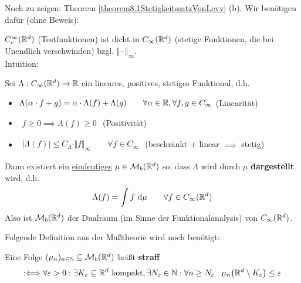 Noch zu zeigen: Theorem \ref{theorem8.1StetigkeitssatzVonLevy} (b). Wir benötigen dafür (ohne Beweis):

\begin{lemma}\label{lemma8.2}
	$C_c^\infty(\mathbb{R}^d)$ (Testfunktionen) ist dicht in $C_\infty(\mathbb{R}^d)$ (stetige Funktionen, die bei Unendlich verschwinden) bzgl. $\Vert\cdot\Vert_\infty$.\\
	Intuition: %
\end{lemma}

\begin{theorem}\label{theorem8.4RieszscherDarstellungssatzFuerM_b}\enter
	Sei $\Lambda:C_\infty(\mathbb{R}^d)\to\mathbb{R}$ ein lineares, positives, stetiges Funktional, d.h.
	\begin{itemize}
		\item $\begin{aligned}
			\Lambda(\alpha\cdot f+g)=\alpha\cdot\Lambda(f)+\Lambda(g)\qquad\forall\alpha\in\mathbb{R},\forall f,g\in C_\infty
		\end{aligned}$ (Linearität)
		\item $\begin{aligned}
			f\geq0\implies\Lambda(f)\geq0
		\end{aligned}$ (Positivität)
		\item $\begin{aligned}
			\big|\Lambda(f)\big|\leq C_\Lambda\cdot\Vert f\Vert_\infty\qquad\forall f\in C_\infty
		\end{aligned}$ (beschränkt + linear $\implies$ stetig)
	\end{itemize} 
	Dann existiert ein \underline{eindeutiges} $\mu\in\mathcal{M}_b(\mathbb{R}^d)$ so, dass $\Lambda$ wird durch $\mu$ \textbf{dargestellt} wird, d.h.
	\begin{align*}
		\Lambda(f)=\int\limits f\text{ d}\mu\qquad\forall f\in C_\infty(\mathbb{R}^d)
	\end{align*}
	Also ist $\mathcal{M}_b(\mathbb{R}^d)$ der Dualraum (im Sinne der Funktionalanalysis) von $C_\infty(\mathbb{R}^d)$.
\end{theorem}

Folgende Definition aus der Maßtheorie wird noch benötigt:

\begin{defi}[Straffheit]
	Eine Folge $(\mu_n)_{n\in\mathbb{N}}\subseteq\mathcal{M}_b(\mathbb{R}^d)$ heißt \textbf{straff}
	\begin{align*}
		:\Longleftrightarrow
		\forall\varepsilon>0:\exists K_\varepsilon\subseteq\mathbb{R}^d\text{ kompakt},\exists N_\varepsilon\in\mathbb{N}:\forall n\geq N_\varepsilon:
		\mu_n\big(\mathbb{R}^d\setminus K_\varepsilon\big)\leq\varepsilon
	\end{align*}
\end{defi}

